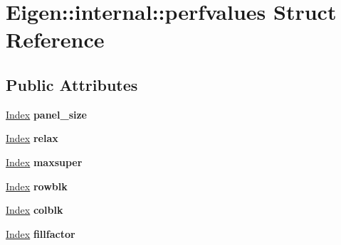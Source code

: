 \hypertarget{struct_eigen_1_1internal_1_1perfvalues}{}\section{Eigen\+:\+:internal\+:\+:perfvalues Struct Reference}
\label{struct_eigen_1_1internal_1_1perfvalues}
\subsection*{Public Attributes}
\begin{DoxyCompactItemize}
\item 
\mbox{\label{struct_eigen_1_1internal_1_1perfvalues_a2748521392b14bbcc12d4ec8ad15ddf1}} 
\hyperlink{namespace_eigen_a62e77e0933482dafde8fe197d9a2cfde}{Index} {\bfseries panel\+\_\+size}
\item 
\mbox{\label{struct_eigen_1_1internal_1_1perfvalues_a216549b3c18a3a3cbb3a59cc9e90b668}} 
\hyperlink{namespace_eigen_a62e77e0933482dafde8fe197d9a2cfde}{Index} {\bfseries relax}
\item 
\mbox{\label{struct_eigen_1_1internal_1_1perfvalues_a28c5f327f26ed6071d55d31b8bd13c7f}} 
\hyperlink{namespace_eigen_a62e77e0933482dafde8fe197d9a2cfde}{Index} {\bfseries maxsuper}
\item 
\mbox{\label{struct_eigen_1_1internal_1_1perfvalues_a34a7f1ca383030043ac9d45eb5ea80b1}} 
\hyperlink{namespace_eigen_a62e77e0933482dafde8fe197d9a2cfde}{Index} {\bfseries rowblk}
\item 
\mbox{\label{struct_eigen_1_1internal_1_1perfvalues_a5b84264675f896dadf7bd23bd165ca71}} 
\hyperlink{namespace_eigen_a62e77e0933482dafde8fe197d9a2cfde}{Index} {\bfseries colblk}
\item 
\mbox{\label{struct_eigen_1_1internal_1_1perfvalues_a753e3fe218963805700187736fc3af0e}} 
\hyperlink{namespace_eigen_a62e77e0933482dafde8fe197d9a2cfde}{Index} {\bfseries fillfactor}
\end{DoxyCompactItemize}


